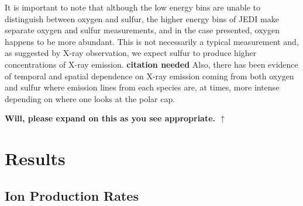 \documentclass[draft]{agujournal2018}
\begin{document}
It is important to note that although the low energy bins are unable to distinguish between oxygen and sulfur, the higher energy bins of JEDI make separate oxygen and sulfur measurements, and in the case presented, oxygen happens to be more abundant.
This is not necessarily a typical measurement and, as suggested by X-ray observation, we expect sulfur to produce higher concentrations of X-ray emission. \textbf{citation needed}
Also, there has been evidence of temporal and spatial dependence on X-ray emission coming from both oxygen and sulfur where emission lines from each species are, at times, more intense depending on where one looks at the polar cap.


\noindent\textbf{\Large Will, please expand on this as you see appropriate. $\uparrow$}

\section{Results}

\subsection{Ion Production Rates}
\end{document}

